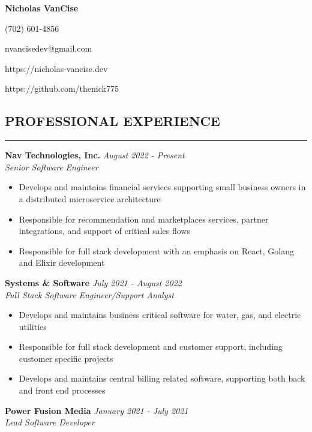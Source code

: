 \documentclass{res}
\begin{document}
	\thispagestyle{empty} %
	\centerline{\bf \Large{Nicholas VanCise}}
	\centerline{(702) 601-4856}
	\centerline{nvancisedev@gmail.com}
  \centerline{https://nicholas-vancise.dev}
  \centerline{https://github.com/thenick775}
  \vspace{-18pt}

	\begin{resume}

		\section{{PROFESSIONAL EXPERIENCE}}
    \noindent\rule[0.5ex]{\linewidth}{1pt}
    		{\bf Nav Technologies, Inc.} \hfill \emph{August 2022 - Present} \\
			\emph{Senior Software Engineer}

			\begin{itemize} \itemsep -2pt
				\item Develops and maintains financial services supporting small business owners in a distributed microservice architecture
				\item Responsible for recommendation and marketplaces services, partner integrations, and support of critical sales flows
				\item Responsible for full stack development with an emphasis on React, Golang and Elixir development
			\end{itemize} \vspace{-2mm}
    		
    		{\bf Systems \& Software} \hfill \emph{July 2021 - August 2022} \\
			\emph{Full Stack Software Engineer/Support Analyst}

			\begin{itemize} \itemsep -2pt
				\item Develops and maintains business critical software for water, gas, and electric utilities
				\item Responsible for full stack development and customer support, including customer specific projects
				\item Develops and maintains central billing related software, supporting both back and front end processes
			\end{itemize} \vspace{-2mm}
			
	    {\bf Power Fusion Media} \hfill \emph{January 2021 - July 2021} \\
			\emph{Lead Software Developer}


\end{resume}
\end{document}
